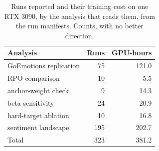 \begin{table}[t]
\centering
\caption{Runs reported and their training cost on one RTX 3090, by the analysis that reads them, from the run manifests. Counts, with no better direction.}
\label{tab:compute}
\footnotesize
\begin{tabular}{lrr}
\toprule
Analysis & Runs & GPU-hours \\
\midrule
GoEmotions replication & 75 & 121.0 \\
RPO comparison & 10 & 5.5 \\
anchor-weight check & 9 & 14.3 \\
beta sensitivity & 24 & 20.9 \\
hard-target ablation & 10 & 16.8 \\
sentiment landscape & 195 & 202.7 \\
\midrule
Total & 323 & 381.2 \\
\bottomrule
\end{tabular}
\end{table}
